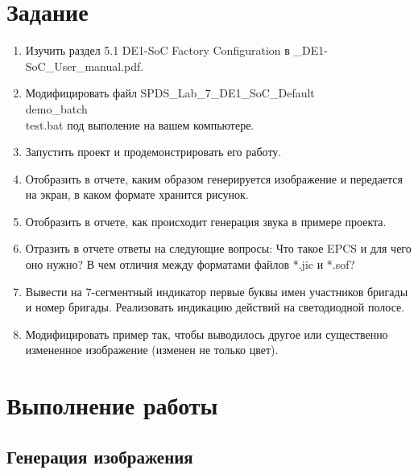 \documentclass[a4paper,14pt]{article}
\begin{document}
	
	\tableofcontents
	\pagebreak
	\section{Задание}
	
	\begin{enumerate}
		
		\item	Изучить раздел 5.1 DE1-SoC Factory Configuration в \_DE1-SoC\_User\_manual.pdf.
		
		\item	Модифицировать файл SPDS\_Lab\_7\_DE1\_SoC\_Default\\demo\_batch\\test.bat под выполение на вашем компьютере. 
		
		\item	Запустить проект и продемонстрировать его работу. 
			
		\item	Отобразить в отчете, каким образом генерируется изображение и передается на экран, в каком формате хранится рисунок.
		
		\item	Отобразить в отчете, как происходит генерация звука в примере проекта.
		
		\item	Отразить в отчете ответы на следующие вопросы: Что такое EPCS и для чего оно нужно? В чем отличия между форматами файлов *.jic и *.sof?
		
		\item	Вывести на 7-сегментный индикатор первые буквы имен участников бригады и номер бригады. Реализовать индикацию действий на светодиодной полосе. 

		\item	Модифицировать пример так, чтобы выводилось другое или существенно измененное изображение (изменен не только цвет). 
		
		
	\end{enumerate}

	
	\section{Выполнение работы}
	
	\subsection{Генерация изображения}
	
\end{document}
